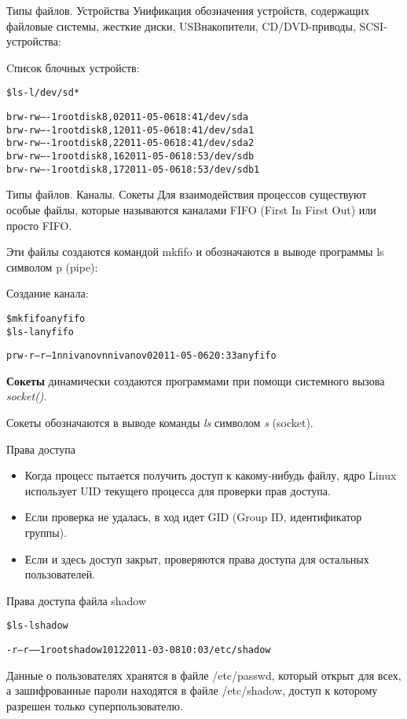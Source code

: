 \documentclass{beamer}
\begin{document}
\begin{frame}[fragile]{Типы файлов. Устройства}
Унификация обозначения устройств, содержащих файловые системы, жесткие диски, USBнакопители, CD/DVD-приводы, SCSI-устройства:
\begin{block}{Cписок блочных устройств:}
\begin{alltt}
\$ ls -l /dev/sd*

brw-rw---- 1 root disk 8, 0 2011-05-06 18:41 /dev/sda
brw-rw---- 1 root disk 8, 1 2011-05-06 18:41 /dev/sda1
brw-rw---- 1 root disk 8, 2 2011-05-06 18:41 /dev/sda2
brw-rw---- 1 root disk 8, 16 2011-05-06 18:53 /dev/sdb
brw-rw---- 1 root disk 8, 17 2011-05-06 18:53 /dev/sdb1
\end{alltt}
\end{block}
\end{frame}

\begin{frame}[fragile]{Типы файлов. Каналы. Сокеты}
Для взаимодействия процессов существуют особые файлы, которые называются
каналами FIFO (First In First Out) или просто FIFO. 

Эти файлы создаются командой mkfifo и обозначаются в выводе программы ls символом p (pipe):
\begin{block}{Создание канала:}
\begin{alltt}
\$ mkfifo anyfifo
\$ ls -l anyfifo

prw-r--r-- 1 nnivanov nnivanov 0 2011-05-06 20:33 anyfifo
\end{alltt}
\end{block}
\textbf{Сокеты }динамически создаются программами при помощи системного вызова \textit{socket()}. 

Сокеты обозначаются в выводе команды \textit{ls} символом \textit{s} (socket). 
\end{frame}

\begin{frame}[fragile]{Права доступа}
\begin{itemize}
\item Когда процесс пытается получить доступ к какому-нибудь файлу, ядро Linux использует UID текущего процесса для проверки прав доступа.
\item Если проверка не удалась, в ход идет GID (Group ID, идентификатор группы). 
\item Если и здесь доступ закрыт, проверяются права доступа для остальных пользователей.
\end{itemize}
\begin{block}{Права доступа файла shadow}
\begin{alltt}
\$ ls -l shadow

-r--r----- 1 root shadow 1012 2011-03-08 10:03 /etc/shadow
\end{alltt}
\end{block}
Данные о пользователях хранятся в файле /etc/passwd, который открыт для всех, а зашифрованные пароли находятся в
файле /etc/shadow, доступ к которому разрешен только суперпользователю.
\end{frame}
\end{document}
